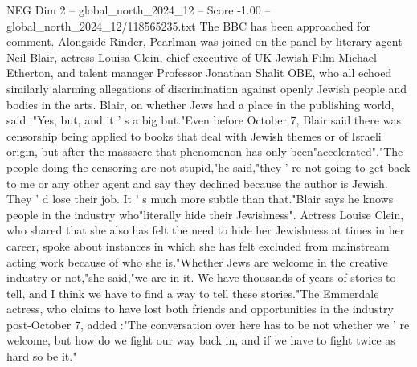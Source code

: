 \begin{textsample}{NEG Dim 2 – global\_north\_2024\_12 – Score -1.00 – global\_north\_2024\_12/118565235.txt}
The BBC has been approached for comment.
Alongside Rinder, Pearlman was joined on the panel by literary agent Neil Blair, actress Louisa Clein, chief executive of UK Jewish Film Michael Etherton, and talent manager Professor Jonathan Shalit OBE, who all echoed similarly alarming allegations of discrimination against openly Jewish people and bodies in the arts.
Blair, on whether Jews had a place in the publishing world, said :"Yes, but, and it ' s a big but."Even before October 7, Blair said there was censorship being applied to books that deal with Jewish themes or of Israeli origin, but after the massacre that phenomenon has only been"accelerated"."The people doing the censoring are not stupid,"he said,"they ' re not going to get back to me or any other agent and say they declined because the author is Jewish.
They ' d lose their job.
It ' s much more subtle than that."Blair says he knows people in the industry who"literally hide their Jewishness".
Actress Louise Clein, who shared that she also has felt the need to hide her Jewishness at times in her career, spoke about instances in which she has felt excluded from mainstream acting work because of who she is."Whether Jews are welcome in the creative industry or not,"she said,"we are in it.
We have thousands of years of stories to tell, and I think we have to find a way to tell these stories."The Emmerdale actress, who claims to have lost both friends and opportunities in the industry post-October 7, added :"The conversation over here has to be not whether we ' re welcome, but how do we fight our way back in, and if we have to fight twice as hard so be it."

\end{textsample}

